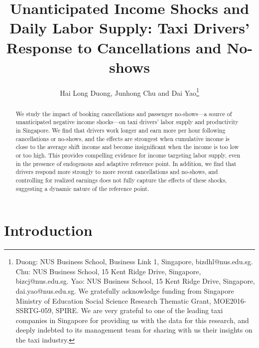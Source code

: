 \documentclass[reviewmode,AEJ]{AEA}
\begin{document}

\title{Unanticipated Income Shocks and Daily Labor Supply: Taxi Drivers' Response to Cancellations and No-shows}
\author{Hai Long Duong, Junhong Chu and Dai Yao\thanks{Duong: NUS Business School, Business Link 1, Singapore, bizdhl@nus.edu.sg. Chu: NUS Business School, 15 Kent Ridge Drive, Singapore, bizcj@nus.edu.sg. Yao: NUS Business School, 15 Kent Ridge Drive, Singapore, dai.yao@nus.edu.sg. We gratefully acknowledge funding from Singapore Ministry of Education Social Science Research Thematic Grant, MOE2016-SSRTG-059, SPIRE. We are very grateful to one of the leading taxi companies in Singapore for providing us with the data for this research, and deeply indebted to its management team for sharing with us their insights on the taxi industry.}}


\begin{abstract}
	We study the impact of booking cancellations and passenger no-shows---a source of unanticipated negative 
	income shocks---on taxi drivers' labor supply and productivity in Singapore. We find that 
	drivers work longer and earn more per hour following cancellations or no-shows, and the 
    effects are strongest when cumulative income is close to the average shift income and become 
    insignificant when the income is too low or too high. This provides 
	compelling evidence for income targeting labor supply, even in the presence of endogenous and adaptive 
	reference point. In addition, we find that drivers respond more strongly to more recent 
	cancellations and no-shows, and controlling for realized earnings does not fully capture the effects of these shocks,
	suggesting a dynamic nature of the reference point. 
\end{abstract}

\maketitle


\newpage

\section{Introduction}
\end{document}
